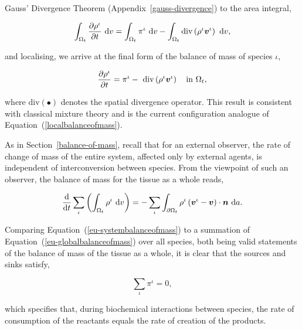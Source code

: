 \noindent Gauss' Divergence Theorem (Appendix~\ref{gauss-divergence})
to the area integral,

\begin{equation*}
\int_{\Omega_{t}} \frac{\partial \rho^{\iota}}{\partial t}
\ \mathrm{d}v = \int_{\Omega_{t}} \pi^{\iota} \ \mathrm{d}v -
\int_{\Omega_{t}} \mathrm{div} \left( \rho^{\iota} \mbox{\boldmath$ v$}^{\iota}\right)
\ \mathrm{d}v,
\end{equation*}

\noindent and localising, we arrive at the final form of the balance
of mass of species $\iota$,

\begin{equation}
\frac{\partial \rho^{\iota}}{\partial t} = \pi^{\iota} -\ \mathrm{div}
\left(\rho^{\iota} \mbox{\boldmath$ v$}^{\iota}\right) \quad \mathrm{in}\ \Omega_{t},
\label{eu-localbalanceofmass}
\end{equation}

\noindent where $\mathrm{div} (\bullet)$ denotes the spatial
divergence operator. This result is consistent with classical mixture
theory \citep{TruesdellToupin:60} and is the current configuration
analogue of Equation~(\ref{localbalanceofmass}).

As in Section~\ref{balance-of-mass}, recall that for an external
observer, the rate of change of mass of the entire system, affected
only by external agents, is independent of interconversion between
species. From the viewpoint of such an observer, the balance of mass
for the tissue as a whole reads,

\begin{equation}
\frac{\mathrm{\mathrm{d}}}{\mathrm{\mathrm{d}}t} \sum\limits_{\iota}
\left(\int_{\Omega_{t}} \rho^{\iota} \ \mathrm{d}v \right) =
-\sum\limits_{\iota} \int_{\partial \Omega_{t}} \rho^{\iota}
\left(\mbox{\boldmath$ v$}^{\iota} - \mbox{\boldmath$ v$}\right) \cdot \mbox{\boldmath$ n$}\ \mathrm{d}a.
\label{eu-systembalanceofmass}
\end{equation}

\noindent Comparing Equation~(\ref{eu-systembalanceofmass}) to a
summation of Equation~(\ref{eu-globalbalanceofmass}) over all species,
both being valid statements of the balance of mass of the tissue as a
whole, it is clear that the sources and sinks satisfy,

\begin{equation}
\sum\limits_{\iota}\pi^{\iota} = 0,
\label{eu-summationrelationmass}
\end{equation}

\noindent which specifies that, during biochemical interactions
between species, the rate of consumption of the reactants equals the
rate of creation of the products.

